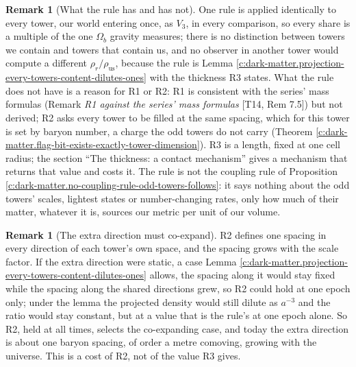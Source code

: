 \documentclass[11pt]{article}
\theoremstyle{definition}
\newtheorem{remark}[theorem]{Remark}
\theoremstyle{plain}
\newcommand{\changedmark}[2]{\marginpar{\raggedright\scriptsize\color{#1}#2}}
\begin{document}
\begin{remark}[What the rule has and has not]\label{c:note.dark-matter.what-rule-has-has-not}
\changedmark{BurntOrange}{changed since the deposit}
One rule is applied identically to every tower, our world entering once, as $V_{3}$, in every comparison, so every share is a multiple of the one $\Omega_{b}$ gravity measures; there is no distinction between towers we contain and towers that contain us, and no observer in another tower would compute a different $\rho_{r}/\rho_{\mathrm{us}}$, because the rule is Lemma \ref{c:dark-matter.projection-every-towers-content-dilutes-ones} with the thickness R3 states. What the rule does not have is a reason for R1 or R2: R1 is consistent with the series' mass formulas (Remark \emph{R1 against the series' mass formulas} [T14, Rem 7.5]) but not derived; R2 asks every tower to be filled at the same spacing, which for this tower is set by baryon number, a charge the odd towers do not carry (Theorem \ref{c:dark-matter.flag-bit-exists-exactly-tower-dimension}). R3 is a length, fixed at one cell radius; the section ``The thickness: a contact mechanism'' gives a mechanism that returns that value and costs it. The rule is not the coupling rule of Proposition \ref{c:dark-matter.no-coupling-rule-odd-towers-follows}: it says nothing about the odd towers' scales, lightest states or number-changing rates, only how much of their matter, whatever it is, sources our metric per unit of our volume.
\end{remark}

\begin{remark}[The extra direction must co-expand]\label{c:note.dark-matter.extra-direction-must-co-expand}
\changedmark{BurntOrange}{changed since the deposit}
R2 defines one spacing in every direction of each tower's own space, and the spacing grows with the scale factor. If the extra direction were static, a case Lemma \ref{c:dark-matter.projection-every-towers-content-dilutes-ones} allows, the spacing along it would stay fixed while the spacing along the shared directions grew, so R2 could hold at one epoch only; under the lemma the projected density would still dilute as $a^{-3}$ and the ratio would stay constant, but at a value that is the rule's at one epoch alone. So R2, held at all times, selects the co-expanding case, and today the extra direction is about one baryon spacing, of order a metre comoving, growing with the universe. This is a cost of R2, not of the value R3 gives.
\end{remark}
\end{document}
